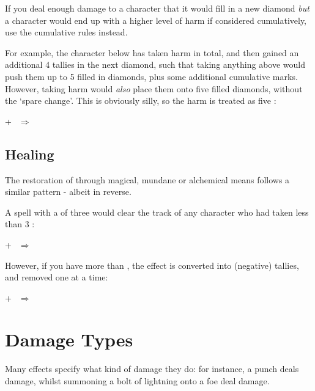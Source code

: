 If you deal enough damage to a character that it would fill in a new diamond {\it but} a character would end up with a higher level of harm if considered cumulatively, use the cumulative rules instead. 

For example, the character below has taken  harm in total, and then gained an additional 4 tallies in the next diamond, such that taking anything above  would push them up to 5 filled in diamonds, plus some additional cumulative marks. However, taking  harm would {\it also} place them onto five filled diamonds, without the `spare change'. This is obviously silly, so the harm is treated as five :


\begin{center}
	 + $~~\Longrightarrow~~$
\end{center}

\subsection{Healing}

The restoration of  through magical, mundane or alchemical means follows a similar pattern - albeit in reverse. 

A  spell with a  of three would clear the  track of any character who had taken less than 3 :

\begin{center}
	 + $~~\Longrightarrow~~$
\end{center}

However, if you have more  than , the effect is converted into (negative) tallies, and removed one at a time:

\begin{center}
	 + $~~\Longrightarrow~~$
\end{center}


\section{Damage Types}



Many effects specify what kind of damage they do: for instance, a punch deals  damage, whilst summoning a bolt of lightning onto a foe deal  damage. 

